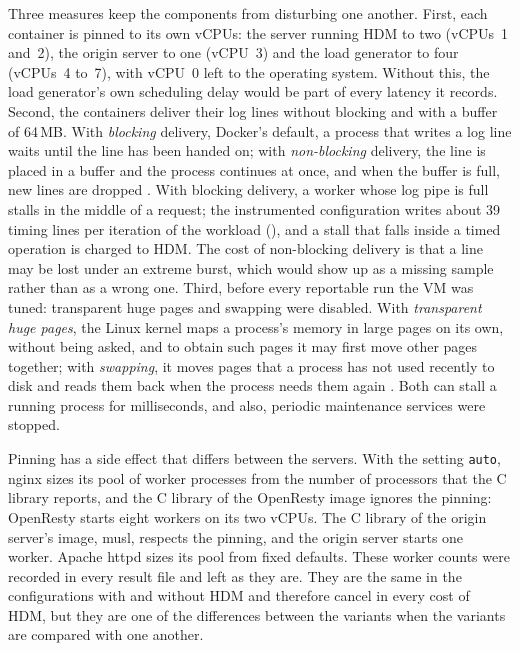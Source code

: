 \documentclass{rptuma}
\begin{document}
Three measures keep the components from disturbing one another. First, each container is pinned to
its own vCPUs: the server running HDM to two (vCPUs~1 and~2), the origin server to one (vCPU~3) and the
load generator to four (vCPUs~4 to~7), with vCPU~0 left to the operating system. Without this, the
load generator's own scheduling delay would be part of every latency it records. Second, the
containers deliver their log lines without blocking and with a buffer of 64\,MB. With
\emph{blocking} delivery, Docker's default, a process that writes a log line waits until the line
has been handed on; with \emph{non-blocking} delivery, the line is placed in a buffer and the process
continues at once, and when the buffer is full, new lines are dropped \cite{docker_logging}. With
blocking delivery, a worker whose log pipe is full stalls in the middle of a request; the instrumented
configuration writes about 39 timing lines per iteration of the workload
(), and a stall that falls inside a timed operation is charged to
HDM. The cost of non-blocking delivery is that a line may be lost under an
extreme burst, which would show up as a missing sample rather than as a wrong one. Third, before
every reportable run the VM was tuned: transparent huge pages and swapping were disabled.
With \emph{transparent huge pages}, the Linux kernel maps a process's memory in large pages on its
own, without being asked, and to obtain such pages it may first move other pages together; with
\emph{swapping}, it moves pages that a process has not used recently to disk and reads them back
when the process needs them again \cite{kernel_mm_concepts}. Both can stall a running process for
milliseconds, and also, periodic maintenance services were stopped.

Pinning has a side effect that differs between the servers. With the setting \texttt{auto}, nginx
sizes its pool of worker processes from the number of processors that the C library reports, and the
C library of the OpenResty image ignores the pinning: OpenResty starts eight workers on its two vCPUs.
The C library of the origin server's image, musl, respects the pinning, and the origin server starts
one worker. Apache httpd sizes its pool from fixed defaults. These worker counts were recorded in
every result file and left as they are. They are the same in the configurations with and without
HDM and therefore cancel in every cost of HDM, but they are one of the differences between the
variants when the variants are compared with one another.
\end{document}

